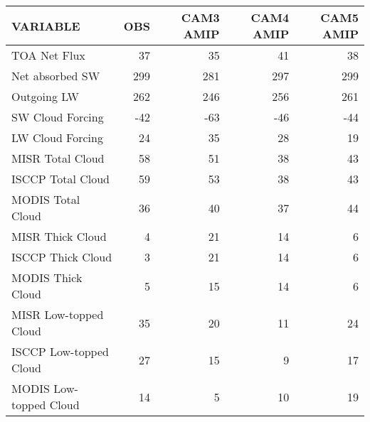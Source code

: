 \begin{tabular}{lrrrr}
\hline
                VARIABLE &                      OBS &                CAM3 AMIP &                CAM4 AMIP &                CAM5 AMIP \\ \hline
            TOA Net Flux &                       37 &                       35 &                       41 &                       38 \\
         Net absorbed SW &                      299 &                      281 &                      297 &                      299 \\
             Outgoing LW &                      262 &                      246 &                      256 &                      261 \\
        SW Cloud Forcing &                      -42 &                      -63 &                      -46 &                      -44 \\
        LW Cloud Forcing &                       24 &                       35 &                       28 &                       19 \\
        MISR Total Cloud &                       58 &                       51 &                       38 &                       43 \\
       ISCCP Total Cloud &                       59 &                       53 &                       38 &                       43 \\
       MODIS Total Cloud &                       36 &                       40 &                       37 &                       44 \\
        MISR Thick Cloud &                        4 &                       21 &                       14 &                        6 \\
       ISCCP Thick Cloud &                        3 &                       21 &                       14 &                        6 \\
       MODIS Thick Cloud &                        5 &                       15 &                       14 &                        6 \\
   MISR Low-topped Cloud &                       35 &                       20 &                       11 &                       24 \\
  ISCCP Low-topped Cloud &                       27 &                       15 &                        9 &                       17 \\
  MODIS Low-topped Cloud &                       14 &                        5 &                       10 &                       19 \\

\end{tabular}
